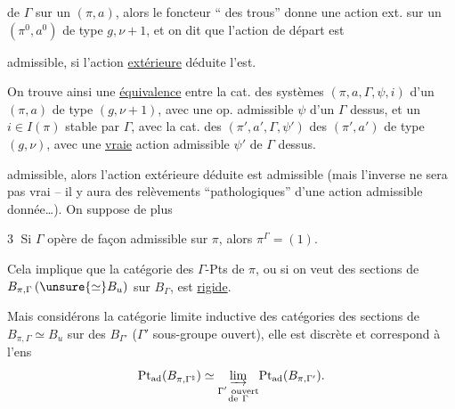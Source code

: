 de $\Gamma$ sur un $(\pi,a)$, alors le foncteur
 `` des trous'' donne une action
ext. sur un $(\pi^0,a^0)$ de type $g,\nu+1$,
et on dit que l'action de départ est


admissible, si l'action \uline{extérieure} déduite l'est.

On trouve ainsi une \uline{équivalence} entre
la cat. des  systèmes $(\pi,a,\Gamma,\psi,i)$
d'un $(\pi,a)$ de type $(g,\nu+1)$, avec une
op.  admissible $\psi$ d'un $\Gamma$ dessus, et
un $i\in I(\pi)$ stable par $\Gamma$, avec la cat.
des $(\pi',a',\Gamma,\psi')$ des $(\pi',a')$ de type
$(g,\nu)$, avec une \uline{vraie} action admissible $\psi'$
de $\Gamma$ dessus.

admissible, alors l'action extérieure déduite
est admissible (mais l'inverse ne
sera pas vrai -- il y aura des relèvements
``pathologiques'' d'une action  admissible
donnée\ldots). On suppose de plus

\textcircled{3} Si $\Gamma$ opère  de façon admissible sur
$\pi$, alors $\pi^\Gamma=(1)$.

Cela implique que la catégorie des
$\Gamma$-Pts de $\pi$, ou si on veut des sections
de $B_{\pi,\Gamma}\,(\unsure{\simeq}B_u)$ sur $B_\Gamma$, est \uline{rigide}.


Mais  considérons la catégorie limite inductive des  catégories des sections de $B_{\pi,\Gamma}\simeq B_u$ sur des $B_{\Gamma'}$ ($\Gamma'$ sous-groupe ouvert), elle est discrète et correspond à l'ens
\[
\mathrm{Pt}_{\mathrm{ad}}(B_{\pi,\Gamma^{\natural}})\simeq
\underset{\substack{\Gamma'\ \mathrm{ouvert}\\\mathrm{de}\ \Gamma}}{\varinjlim}
\mathrm{Pt}_{\mathrm{ad}}(B_{\pi,\Gamma'}).
\]

